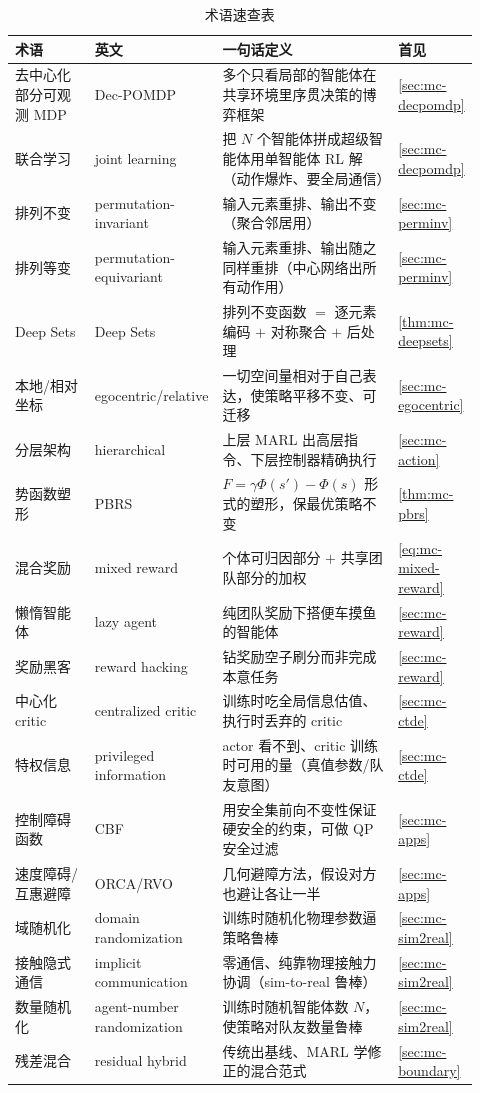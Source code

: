 \begin{table}[H]\centering\small
\caption{术语速查表}
\label{tab:mc-glossary}
\begin{tabular}{p{0.20\linewidth}p{0.24\linewidth}p{0.40\linewidth}p{0.08\linewidth}}
\toprule
术语 & 英文 & 一句话定义 & 首见 \\
\midrule
去中心化部分可观测 MDP & Dec-POMDP & 多个只看局部的智能体在共享环境里序贯决策的博弈框架 & \cref{sec:mc-decpomdp} \\
联合学习 & joint learning & 把 $N$ 个智能体拼成超级智能体用单智能体 RL 解（动作爆炸、要全局通信） & \cref{sec:mc-decpomdp} \\
排列不变 & permutation-invariant & 输入元素重排、输出不变（聚合邻居用） & \cref{sec:mc-perminv} \\
排列等变 & permutation-equivariant & 输入元素重排、输出随之同样重排（中心网络出所有动作用） & \cref{sec:mc-perminv} \\
Deep Sets & Deep Sets & 排列不变函数 $=$ 逐元素编码 $+$ 对称聚合 $+$ 后处理 & \cref{thm:mc-deepsets} \\
本地/相对坐标 & egocentric/relative & 一切空间量相对于自己表达，使策略平移不变、可迁移 & \cref{sec:mc-egocentric} \\
分层架构 & hierarchical & 上层 MARL 出高层指令、下层控制器精确执行 & \cref{sec:mc-action} \\
势函数塑形 & PBRS & $F=\gamma\Phi(s')-\Phi(s)$ 形式的塑形，保最优策略不变 & \cref{thm:mc-pbrs} \\
混合奖励 & mixed reward & 个体可归因部分 $+$ 共享团队部分的加权 & \cref{eq:mc-mixed-reward} \\
懒惰智能体 & lazy agent & 纯团队奖励下搭便车摸鱼的智能体 & \cref{sec:mc-reward} \\
奖励黑客 & reward hacking & 钻奖励空子刷分而非完成本意任务 & \cref{sec:mc-reward} \\
中心化 critic & centralized critic & 训练时吃全局信息估值、执行时丢弃的 critic & \cref{sec:mc-ctde} \\
特权信息 & privileged information & actor 看不到、critic 训练时可用的量（真值参数/队友意图） & \cref{sec:mc-ctde} \\
控制障碍函数 & CBF & 用安全集前向不变性保证硬安全的约束，可做 QP 安全过滤 & \cref{sec:mc-apps} \\
速度障碍/互惠避障 & ORCA/RVO & 几何避障方法，假设对方也避让各让一半 & \cref{sec:mc-apps} \\
域随机化 & domain randomization & 训练时随机化物理参数逼策略鲁棒 & \cref{sec:mc-sim2real} \\
接触隐式通信 & implicit communication & 零通信、纯靠物理接触力协调（sim-to-real 鲁棒） & \cref{sec:mc-sim2real} \\
数量随机化 & agent-number randomization & 训练时随机智能体数 $N$，使策略对队友数量鲁棒 & \cref{sec:mc-sim2real} \\
残差混合 & residual hybrid & 传统出基线、MARL 学修正的混合范式 & \cref{sec:mc-boundary} \\
\bottomrule
\end{tabular}
\end{table}

